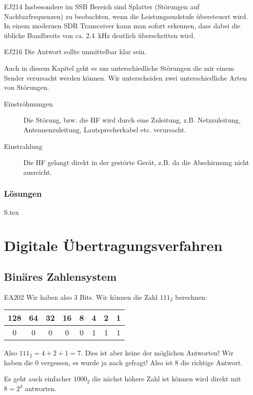 \documentclass[10pt,a4paper,ngerman]{article}
\theoremstyle{definition}
\theoremstyle{plain}
\theoremstyle{mytheorem}
\theoremstyle{definition}
\newenvironment{ohmchapter}{}
{
  \subsubsection*{Lösungen}
  S\arabic{subsection}.tex}
}
\begin{document}
\begin{sol}{EJ214}
Insbesondere im SSB Bereich sind Splatter (Störungen auf Nachbarfrequenzen) zu beobachten, wenn die Leistungsendstufe übersteuert wird. In einem modernen SDR Transceiver kann man sofort erkennen, dass dabei die 
übliche Bandbreite von ca. \SI{2.4} {\kilo\hertz }  deutlich überschritten wird.
\end{sol}

\begin{sol}{EJ216}
  Die Antwort sollte unmittelbar klar sein.
\end{sol}


\begin{ohmchapter}
Auch in diesem Kapitel geht es um unterschiedliche Störungen die mir einem Sender verursacht werden können.
Wir unterscheiden zwei unterschiedliche Arten von Störungen.

\begin{description}
  \item[Einströhmungen] Die Störung, bzw. die HF wird durch eine Zuleitung, z.B. Netzzuleitung, Antennenzuleitung, Lautsprecherkabel etc. verursacht. 
  \item[Einstrahlung] Die HF gelangt direkt in der gestörte Gerät, z.B. da die Abschirmung nicht ausreicht.
\end{description}

\end{ohmchapter}

\section{Digitale Übertragungsverfahren}
\subsection{Binäres Zahlensystem}



\begin{sol}{EA202}
  Wir haben also 3 Bits. Wir können die Zahl $111_2$ berechnen:
    \begin{center}
  \begin{tabular}{|c|c|c|c|c|c|c|c|} 
    128& 64&32&16 &8 & 4 & 2 & 1 \\ \hline
    0&0&0&0&0&1&1&1
  \end{tabular} 
  \end{center}
Also $111_2 = 4+2+1 = 7$. Dies ist aber keine der möglichen Antworten! Wir haben die 0 vergessen, es wurde ja nach  gefragt! Also ist 8 die richtige Antwort.

Es geht auch einfacher $1000_2$ die nächst höhere Zahl ist können wird direkt mit $8 = 2^3$ antworten.
\end{sol}
\end{document}
